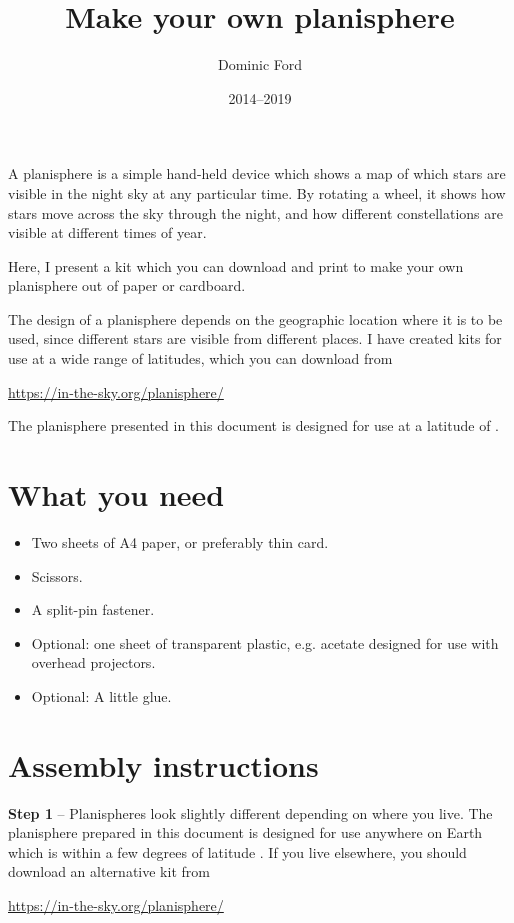 \documentclass[a4paper,onecolumn,10pt]{article}
\title{Make your own planisphere}
\author{Dominic Ford}
\date{2014--2019}
\begin{document}
\maketitle
\setcounter{footnote}{1}

A planisphere is a simple hand-held device which shows a map of which stars are
visible in the night sky at any particular time. By rotating a wheel, it shows
how stars move across the sky through the night, and how different
constellations are visible at different times of year.

Here, I present a kit which you can download and print to make your own
planisphere out of paper or cardboard.

The design of a planisphere depends on the geographic location where it is to
be used, since different stars are visible from different places. I have
created kits for use at a wide range of latitudes, which you can download from

\url{https://in-the-sky.org/planisphere/}

The planisphere presented in this document is designed for use at a latitude of
.
 
\section*{What you need}

\begin{itemize}
\item Two sheets of A4 paper, or preferably thin card.
\item Scissors.
\item A split-pin fastener.
\item Optional: one sheet of transparent plastic, e.g. acetate designed for use with overhead projectors.
\item Optional: A little glue.
\end{itemize}

\section*{Assembly instructions}

{\bf Step 1} -- Planispheres look slightly different depending on where you
live. The planisphere prepared in this document is designed for use anywhere on
Earth which is within a few degrees of latitude . If you live
elsewhere, you should download an alternative kit from

\url{https://in-the-sky.org/planisphere/}
\end{document}
